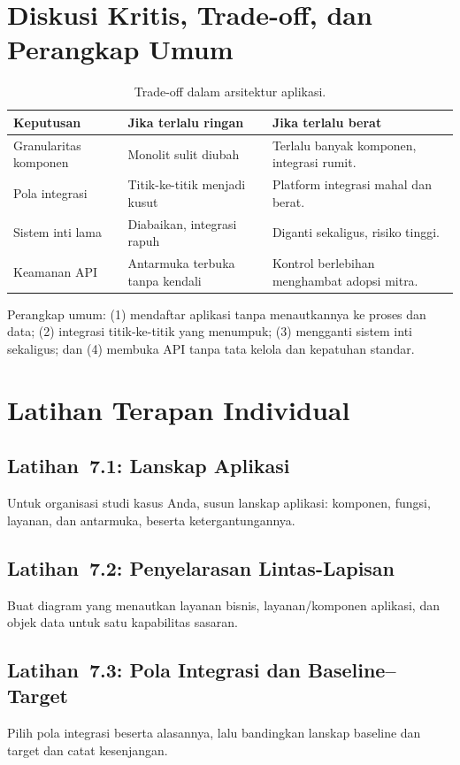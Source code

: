 \section{Diskusi Kritis, Trade-off, dan Perangkap Umum}

\begin{table}[htbp]
\centering
\scriptsize
\caption{Trade-off dalam arsitektur aplikasi.}
\label{tab:tradeoff-bab6-app}
\begin{tabularx}{\textwidth}{@{}p{} X X@{}}
\hline
\textbf{Keputusan} & \textbf{Jika terlalu ringan} & \textbf{Jika terlalu berat} \\
\hline
Granularitas komponen & Monolit sulit diubah & Terlalu banyak komponen, integrasi
rumit. \\
Pola integrasi & Titik-ke-titik menjadi kusut & Platform integrasi mahal dan
berat. \\
Sistem inti lama & Diabaikan, integrasi rapuh & Diganti sekaligus, risiko tinggi. \\
Keamanan API & Antarmuka terbuka tanpa kendali & Kontrol berlebihan menghambat
adopsi mitra. \\
\hline
\end{tabularx}
\end{table}

Perangkap umum: (1) mendaftar aplikasi tanpa menautkannya ke proses dan data;
(2) integrasi titik-ke-titik yang menumpuk; (3) mengganti sistem inti sekaligus;
dan (4) membuka API tanpa tata kelola dan kepatuhan standar.

\section{Latihan Terapan Individual}

\subsection*{Latihan~7.1: Lanskap Aplikasi}
Untuk organisasi studi kasus Anda, susun lanskap aplikasi: komponen, fungsi,
layanan, dan antarmuka, beserta ketergantungannya.

\subsection*{Latihan~7.2: Penyelarasan Lintas-Lapisan}
Buat diagram yang menautkan layanan bisnis, layanan/komponen aplikasi, dan objek
data untuk satu kapabilitas sasaran.

\subsection*{Latihan~7.3: Pola Integrasi dan Baseline--Target}
Pilih pola integrasi beserta alasannya, lalu bandingkan lanskap baseline dan
target dan catat kesenjangan.

